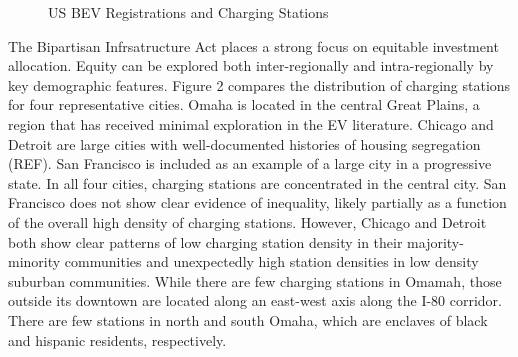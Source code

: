 \documentclass[
  letterpaper,
  DIV=11,
  numbers=noendperiod]{scrartcl}
\begin{document}
\begin{figure}

\begin{minipage}[t]{\linewidth}

{\centering 


\caption{\label{fig-us-totals}US BEV Registrations and Charging
Stations}

}

\end{minipage}%

\end{figure}

The Bipartisan Infrsatructure Act places a strong focus on equitable
investment allocation. Equity can be explored both inter-regionally and
intra-regionally by key demographic features. Figure 2 compares the
distribution of charging stations for four representative cities. Omaha
is located in the central Great Plains, a region that has received
minimal exploration in the EV literature. Chicago and Detroit are large
cities with well-documented histories of housing segregation (REF). San
Francisco is included as an example of a large city in a progressive
state. In all four cities, charging stations are concentrated in the
central city. San Francisco does not show clear evidence of inequality,
likely partially as a function of the overall high density of charging
stations. However, Chicago and Detroit both show clear patterns of low
charging station density in their majority-minority communities and
unexpectedly high station densities in low density suburban communities.
While there are few charging stations in Omamah, those outside its
downtown are located along an east-west axis along the I-80 corridor.
There are few stations in north and south Omaha, which are enclaves of
black and hispanic residents, respectively.
\end{document}
